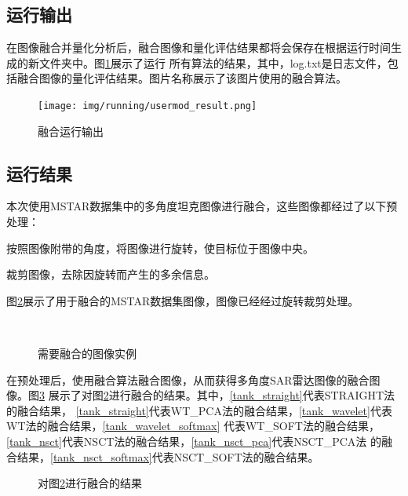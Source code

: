 \documentclass{xduugthesis}
\begin{document}
\subsection{运行输出}
在图像融合并量化分析后，融合图像和量化评估结果都将会保存在根据运行时间生成的新文件夹中。图\ref{user_result}展示了运行
所有算法的结果，其中，log.txt是日志文件，包括融合图像的量化评估结果。图片名称展示了该图片使用的融合算法。\par
\begin{figure}[!htb]
	\centering
	\texttt{[image: img/running/usermod\_result.png]}
	\caption{融合运行输出}\label{user_result}
\end{figure}
\subsection{运行结果}
本次使用MSTAR数据集\cite{MSTAR}中的多角度坦克图像进行融合，这些图像都经过了以下预处理：
\begin{compactenum}
	\item 按照图像附带的角度，将图像进行旋转，使目标位于图像中央。
	\item 裁剪图像，去除因旋转而产生的多余信息。
\end{compactenum}\par
图\ref{tank_dealt_image}展示了用于融合的MSTAR数据集图像，图像已经经过旋转裁剪处理。
\begin{figure}[ht!]
	\centering
	\\
	\caption{需要融合的图像实例}\label{tank_dealt_image}
\end{figure}\par
在预处理后，使用融合算法融合图像，从而获得多角度SAR雷达图像的融合图像。图\ref{tank_merge_result}
展示了对图\ref{tank_dealt_image}进行融合的结果。其中，\ref{tank_straight}代表STRAIGHT法的融合结果，
\ref{tank_straight}代表WT\_PCA法的融合结果，\ref{tank_wavelet}代表WT法的融合结果，\ref{tank_wavelet_softmax}
代表WT\_SOFT法的融合结果，\ref{tank_nsct}代表NSCT法的融合结果，\ref{tank_nsct_pca}代表NSCT\_PCA法
的融合结果，\ref{tank_nsct_softmax}代表NSCT\_SOFT法的融合结果。\par 
\begin{figure}[ht!]
	\centering
	\caption{对图\ref{tank_dealt_image}进行融合的结果}\label{tank_merge_result}
\end{figure}
\end{document}
